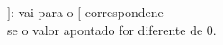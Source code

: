 \documentclass[preview]{standalone}
\begin{document}
$]$: vai para o $[$ correspondene\\se o valor apontado for diferente de 0.\\
\end{document}
